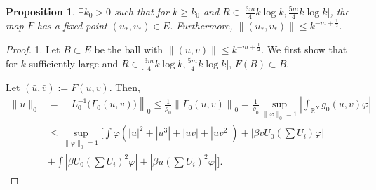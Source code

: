 \documentclass[a4paper,11pt]{article}
\newtheorem{proposition}{Proposition}[section]
\numberwithin{step}{dummy}
\begin{document}
\begin{proposition} \label{Fixed} $\exists k_0>0$ such that for $k\ge k_0$ and $R \in \Big[\frac{3m}{4}k\log k, \frac{5m}{4}k\log k\Big]$, the map $F$ has a fixed point $(u_*,v_*) \in E$. Furthermore, $\|(u_*,v_*)\| \le k^{-m + \frac{1}{2}}.$
 \end{proposition}
\begin{proof}
1. Let $B \subset E$ be the ball with $\|(u,v)\| \le k^{-m + \frac{1}{2}}$. We first show that for $k$ sufficiently large and $R \in \Big[\frac{3m}{4}k\log k, \frac{5m}{4}k\log k\Big]$, $F(B) \subset B$. 

Let $(\bar u, \bar v) := F(u,v)$. Then,
 \begin{align*}
  \|\bar u\|_0 &= \left\|L_0^{-1}\Big(\Gamma_0(u,v)\Big)\right\|_0 \le \frac{1}{\rho_0}\left\|\Gamma_0(u,v)\right\|_0 = \frac{1}{\rho_0} \sup_{\|\varphi\|_0=1} \left| \int_{ \mathbb{R}^N} g_0(u,v) \varphi \right|\\
  &\le \sup_{\|\varphi\|_0=1} \Bigg[ \int \varphi \left( |u|^2 + |u^3| + |uv| + |uv^2|\right) + \left|\beta v U_0\left(\sum U_i\right)\varphi\right|\\
  & + \int  \left|\beta U_0\left(\sum U_i\right)^2\varphi\right| +  \left|\beta u\left(\sum U_i\right)^2\varphi\right|\Bigg].
 \end{align*}
 

\end{proof}
\end{document}

